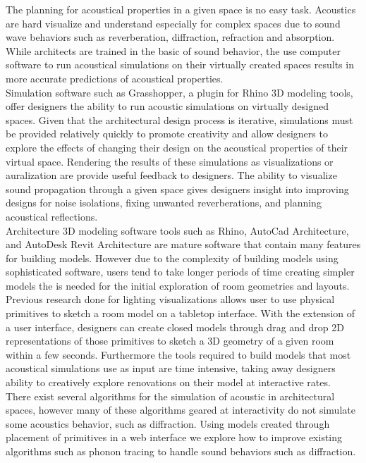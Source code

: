 \documentclass{thesis}
\begin{document}
The planning for acoustical properties in a given space is no easy task. Acoustics are hard visualize and understand especially for complex spaces due to sound wave behaviors such as reverberation, diffraction, refraction and absorption. While architects are trained in the basic of sound behavior, the use computer software to run acoustical simulations on their virtually created spaces results in more accurate predictions of acoustical properties. \\

Simulation software such as Grasshopper\cite{grass}, a plugin for Rhino 3D modeling tools,  offer designers the ability to run acoustic simulations on virtually designed spaces. Given that the architectural design process is iterative, simulations must be provided relatively quickly to promote creativity and allow designers to explore the effects of changing their design on the acoustical properties of their virtual space. Rendering the results of these simulations as visualizations or auralization are provide useful feedback to designers. The ability to visualize sound propagation through a given space gives designers insight into improving designs for noise isolations, fixing unwanted reverberations, and planning acoustical reflections.\\

Architecture 3D modeling software tools such as Rhino, AutoCad Architecture, and AutoDesk Revit Architecture are mature software that contain many features for building models. However due to the complexity of building models using sophisticated software, users tend to take longer periods of time creating simpler models  the is needed for the initial exploration of room geometries and layouts. Previous research done for lighting visualizations allows user to use physical primitives to sketch a room model on a tabletop interface. \cite{josh} With the extension of a user interface, designers can create closed models through drag and drop 2D representations of those primitives to sketch a 3D geometry of a given room within a few seconds.  Furthermore the tools required to build models that most acoustical simulations use as input are time intensive, taking away designers ability to creatively explore renovations on their model at interactive rates.\\

There exist several algorithms for the simulation of acoustic  in architectural spaces, however many of these algorithms geared at interactivity do not simulate some acoustics behavior, such as diffraction.
Using models created through placement of primitives in a web interface we explore how to improve existing algorithms such as phonon tracing \cite{bertram} to handle sound behaviors such as diffraction.\\
\end{document}
